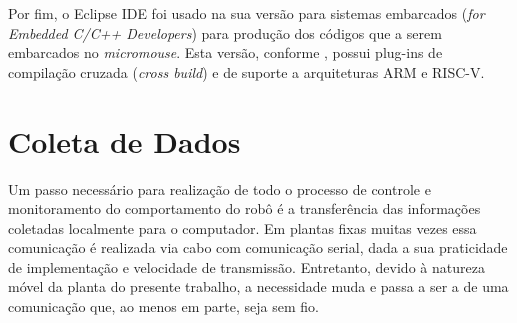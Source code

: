             Por fim, o Eclipse IDE foi usado na sua versão para sistemas embarcados (\textit{for Embedded  C/C++ Developers}) para produção dos códigos que a serem embarcados no \textit{micromouse}. Esta versão, conforme , possui plug-ins de compilação cruzada (\textit{cross build}) e de suporte a arquiteturas ARM e RISC-V.





    
    \section{Coleta de Dados} \label{sec:coleta-dados}
        Um passo necessário para realização de todo o processo de controle e monitoramento do comportamento do robô é a transferência das informações coletadas localmente para o computador. Em plantas fixas muitas vezes essa comunicação é realizada via cabo com comunicação serial, dada a sua praticidade de implementação e velocidade de transmissão. Entretanto, devido à natureza móvel da planta do presente trabalho, a necessidade muda e passa a ser a de uma comunicação que, ao menos em parte, seja sem fio. 
        

